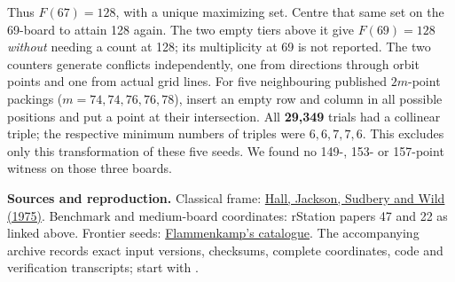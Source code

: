 \documentclass[11pt]{article}
\begin{document}
Thus $F(67)=128$, with a unique maximizing set. Centre that same set on the 69-board to attain 128 again. The two empty tiers above it give $F(69)=128$ \emph{without} needing a count at 128; its multiplicity at 69 is not reported. The two counters generate conflicts independently, one from directions through orbit points and one from actual grid lines.
For five neighbouring published $2m$-point packings ($m=74,74,76,76,78$), insert an empty row and column in all possible positions and put a point at their intersection. All \textbf{29,349} trials had a collinear triple; the respective minimum numbers of triples were $6,6,7,7,6$. This excludes only this transformation of these five seeds. We found no 149-, 153- or 157-point witness on those three boards.

{\footnotesize\textbf{Sources and reproduction.} Classical frame: \href{https://doi.org/10.1016/0097-3165(75)90043-6}{Hall, Jackson, Sudbery and Wild (1975)}. Benchmark and medium-board coordinates: rStation papers 47 and 22 as linked above. Frontier seeds: \href{https://wwwhomes.uni-bielefeld.de/achim/no3in/readme.html}{Flammenkamp's catalogue}. The accompanying archive records exact input versions, checksums, complete coordinates, code and verification transcripts; start with .}
\end{document}

